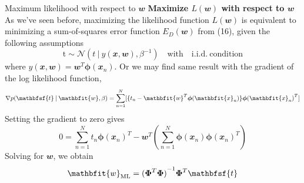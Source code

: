 \documentclass{bredelebeamer}
\begin{document}
\begin{frame}{Maximum likelihood with respect to $\mathbfit{w}$}
  \textbf{Maximize $L(\mathbfit{w})$ with respect to $\mathbfit{w}$}\\
  As we've seen before, maximizing the likelihood function $L(\mathbfit{w})$ is
  equivalent to minimizing a sum-of-squares error function $E_{D}(\mathbfit{w})$
  from (16), given the following assumptions
  \begin{equation}
    \mathrm{t} \sim \mathcal{N} (t \:|\: y(\mathbfit{x}, \mathbfit{w}), \beta^{-1})
    \quad \mathrm{with} \quad \mathrm{i.i.d.\ condition}
  \end{equation}
  where $y(\mathbfit{x}, \mathbfit{w}) = \mathbfit{w}^T \boldsymbol{\phi} (\mathbfit{x}_n)$.
  Or we may find same result with the gradient of the log likelihood function,
  \begin{equation}
    \nabla p(\mathbfsf{t} \:|\: \mathbfit{w}, \beta)
    = \sum_{n=1}^{N} [{\{ t_n - \mathbfit{w}^T \boldsymbol{\phi} (\mathbfit{x}_n) \}} {\boldsymbol{\phi} (\mathbfit{x}_n)}^T]
  \end{equation}
  Setting the gradient to zero gives
  \begin{equation}
    0 = \sum_{n=1}^{N} t_n {\boldsymbol{\phi} (\mathbfit{x}_n)}^T
    - \mathbfit{w}^T \left( \sum_{n=1}^{N} \boldsymbol{\phi}(\mathbfit{x}_n){\boldsymbol{\phi}(\mathbfit{x}_n)}^T\right)
  \end{equation}
  Solving for $\mathbfit{w}$, we obtain
  \begin{equation}
    \mathbfit{w}_\mathrm{ML} = {(\boldsymbol{\Phi}^T\boldsymbol{\Phi})}^{-1} \boldsymbol{\Phi}^T \mathbfsf{t}
  \end{equation}
\end{frame}
\end{document}
